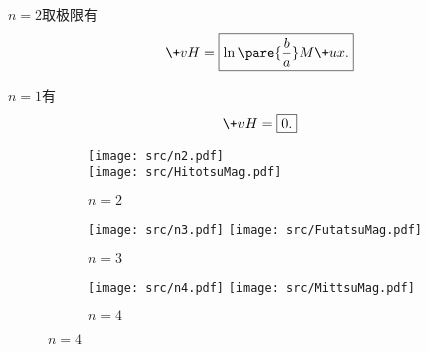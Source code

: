 \documentclass[hidelinks]{ctexart}
\begin{document}
\par
{}$n = 2$取极限有
\[ \+vH = \boxed{\ln \pare{\frac{b}{a}}M \+ux.} \]
\par
{}$n = 1$有
\[ \+vH = \boxed{0.} \]
\begin{figure}[ht]
    \centering
    \begin{subfigure}{.3\textwidth}
        \centering
        \texttt{[image: src/n2.pdf]}\\
        \texttt{[image: src/HitotsuMag.pdf]}\\
        \caption{$n=2$}
    \end{subfigure}
    \begin{subfigure}{.3\textwidth}
        \centering
        \texttt{[image: src/n3.pdf]}
        \texttt{[image: src/FutatsuMag.pdf]}\\
        \caption{$n=3$}
    \end{subfigure}
    \begin{subfigure}{.3\textwidth}
        \centering
        \texttt{[image: src/n4.pdf]}
        \texttt{[image: src/MittsuMag.pdf]}\\
        \caption{$n=4$}
    \end{subfigure}
\end{figure}
\end{document}
